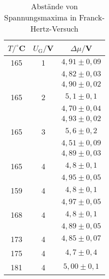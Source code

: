 \begin{table}[h]
    \centering
    \caption{Abstände von Spannungsmaxima in Franck-Hertz-Versuch}
    \label{tab:fh_dist}
    \begin{tabular}{c c c}
      \toprule
      $T/^\circ$C & $U_\mathrm{G}/$V & $\Delta \mu/$V\\
      \midrule
      165&1&$4,91\pm 0,09$\\
      &&$4,82\pm 0,03$\\
      &&$4,90 \pm 0,02$\\
      165&2&$5,1 \pm 0,1$\\
      &&$4,70 \pm 0,04$\\
      &&$4,93 \pm 0,02$\\
      165&3&$5,6 \pm 0,2$\\
      &&$4,51 \pm 0,09$\\
      &&$4,89 \pm 0,03$\\
      165&4&$4,8 \pm 0,1$\\
      &&$4,95 \pm 0,05$\\
      159&4&$4,8 \pm 0,1$\\
      &&$4,97 \pm 0,05$\\
      168&4&$4,8 \pm 0,1$\\
      &&$4,89 \pm 0,05$\\
      173&4&$4,85 \pm 0,07$\\
      175&4&$4,7 \pm 0,4$\\
      181&4&$5,00\pm 0,1$\\
      \bottomrule
    \end{tabular}
  \end{table}
